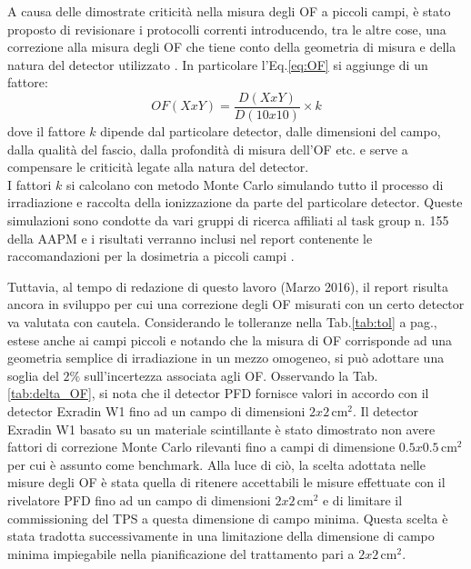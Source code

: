 A causa delle dimostrate criticità nella misura degli OF a piccoli campi, è stato proposto di revisionare i protocolli correnti introducendo, tra le altre cose, una correzione alla misura degli OF che tiene conto della geometria di misura e della natura del detector utilizzato \cite{Alfonso2008}. In particolare l'Eq.\eqref{eq:OF} si aggiunge di un fattore:
\begin{equation}
OF(XxY)=\frac{D(XxY)}{D(10x10)}\times k
\end{equation}
dove il fattore $k$ dipende dal particolare detector, dalle dimensioni del campo, dalla qualità del fascio, dalla profondità di misura dell'OF etc. e serve a compensare le criticità legate alla natura del detector.\\
I fattori $k$ si calcolano con metodo Monte Carlo simulando tutto il processo di irradiazione e raccolta della ionizzazione da parte del particolare detector. Queste simulazioni sono condotte da vari gruppi di ricerca affiliati al task group n. 155 della AAPM e i risultati verranno inclusi nel report contenente le raccomandazioni per la dosimetria a piccoli campi \cite{AAPMTG155}. 

Tuttavia, al tempo di redazione di questo lavoro (Marzo 2016), il report risulta ancora in sviluppo per cui una correzione degli OF misurati con un certo detector va valutata con cautela. Considerando le tolleranze nella Tab.\ref{tab:tol} a pag.\pageref{tab:tol}, estese anche ai campi piccoli \cite{Low2011} e notando che la misura di OF corrisponde ad una geometria semplice di irradiazione in un mezzo omogeneo, si può adottare una soglia del $2\%$ sull'incertezza associata agli OF. Osservando la Tab.\ref{tab:delta_OF}, si nota che il detector PFD fornisce valori in accordo con il detector Exradin W1 fino ad un campo di dimensioni $2x2\,$cm$^2$. Il detector Exradin W1 basato su un materiale scintillante è stato dimostrato non avere fattori di correzione Monte Carlo rilevanti fino a campi di dimensione $0.5x0.5\,$cm$^2$ \cite{Francescon2014} per cui è assunto come benchmark. Alla luce di ciò, la scelta adottata nelle misure degli OF è stata quella di ritenere accettabili le misure effettuate con il rivelatore PFD fino ad un campo di dimensioni $2x2\,$cm$^2$ e di limitare il commissioning del TPS a questa dimensione di campo minima. Questa scelta è stata tradotta successivamente in una limitazione della dimensione di campo minima impiegabile nella pianificazione del trattamento pari a $2x2\,$cm$^2$.

